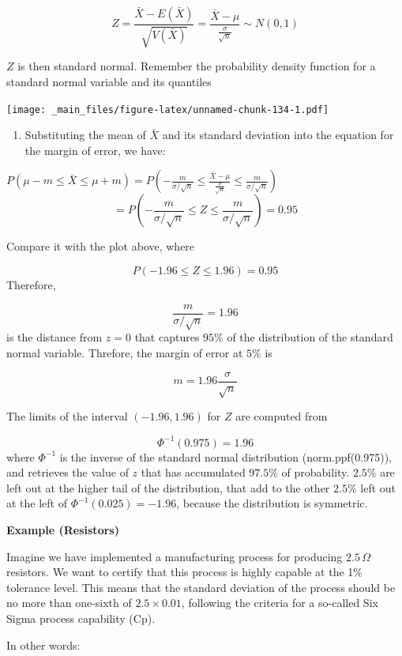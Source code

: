 \documentclass[
]{book}
\providecommand{\tightlist}{%
  \setlength{\itemsep}{0pt}\setlength{\parskip}{0pt}}
\begin{document}
\[Z=\frac{\bar{X}-E(\bar{X})}{\sqrt{V(\bar{X})}} =\frac{\bar{X}-\mu}{\frac{\sigma}{\sqrt{n}}}  \sim N(0,1)\]

\(Z\) is then standard normal. Remember the probability density function for a standard normal variable and its quantiles

\texttt{[image: \_main\_files/figure-latex/unnamed-chunk-134-1.pdf]}

\begin{enumerate}
\def\labelenumi{\arabic{enumi}.}
\setcounter{enumi}{1}
\tightlist
\item
  Substituting the mean of \(\bar{X}\) and its standard deviation into the equation for the margin of error, we have:
\end{enumerate}

\(P(\mu-m \leq \bar{X} \leq\mu + m)=P(-\frac{m}{\sigma/\sqrt{n}} \leq \frac{\bar{X}-\mu}{\frac{\sigma}{\sqrt{n}}}\leq\frac{m}{\sigma/\sqrt{n}})\)
\[=P(-\frac{m}{\sigma/\sqrt{n}} \leq Z \leq\frac{m}{\sigma/\sqrt{n}})=0.95\]

Compare it with the plot above, where

\[P(-1.96 \leq Z \leq 1.96)=0.95\]
Therefore,

\[\frac{m}{\sigma/\sqrt{n}}=1.96\]
is the distance from \(z=0\) that captures \(95\%\) of the distribution of the standard normal variable. Threfore, the margin of error at \(5\%\) is

\[m=1.96\frac{\sigma}{\sqrt{n}}\]

The limits of the interval \((-1.96, 1.96)\) for \(Z\) are computed from

\[\Phi^{-1}(0.975)=1.96\]
where \(\Phi^{-1}\) is the inverse of the standard normal distribution (norm.ppf(0.975)), and retrieves the value of \(z\) that has accumulated \(97.5\%\) of probability. \(2.5\%\) are left out at the higher tail of the distribution, that add to the other \(2.5\%\) left out at the left of \(\Phi^{-1}(0.025)=-1.96\), because the distribution is symmetric.

\textbf{Example (Resistors)}

Imagine we have implemented a manufacturing process for producing \(2.5\,\Omega\) resistors. We want to certify that this process is highly capable at the 1\% tolerance level. This means that the standard deviation of the process should be no more than one-sixth of \(2.5 \times 0.01\), following the criteria for a so-called Six Sigma process capability (Cp).

In other words:
\end{document}
